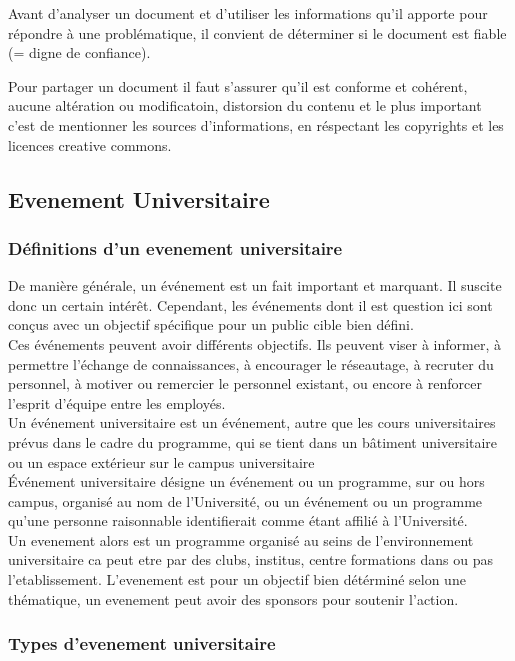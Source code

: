 \documentclass[12pt]{report}
\begin{document}
Avant d’analyser un document et d’utiliser les informations qu’il apporte pour répondre à une problématique, il convient de déterminer si le document est fiable (= digne de confiance).

Pour partager un document il faut s'assurer qu'il est conforme et cohérent, aucune altération ou modificatoin, distorsion du contenu et le plus important c'est de mentionner les sources d'informations, en réspectant les copyrights et les licences creative commons.


\subsection{Evenement Universitaire}
\subsubsection{Définitions d'un evenement universitaire}

De manière générale, un événement est un fait important et marquant. Il suscite donc un certain intérêt. Cependant, les événements dont il est question ici sont conçus avec un objectif spécifique pour un public cible bien défini.
\\Ces événements peuvent avoir différents objectifs. Ils peuvent viser à informer, à permettre l’échange de connaissances, à encourager le réseautage, à recruter du personnel, à motiver ou remercier le personnel existant, ou encore à renforcer l’esprit d’équipe entre les employés\cite{18}.\\


Un événement universitaire est un événement, autre que les cours universitaires prévus dans le cadre du programme, qui se tient dans un bâtiment universitaire ou un espace extérieur sur le campus universitaire\cite{19}\\


Événement universitaire désigne un événement ou un programme, sur ou hors campus, organisé au nom de l'Université, ou un événement ou un programme qu'une personne raisonnable identifierait comme étant affilié à l'Université\cite{20}.\\


Un evenement alors est un programme organisé au seins de l'environnement universitaire ca peut etre par des clubs, institus, centre formations dans ou pas l'etablissement. L'evenement est pour un objectif bien détérminé selon une thématique, un evenement peut avoir des sponsors pour soutenir l'action.
\subsubsection{Types d'evenement universitaire}
\end{document}
